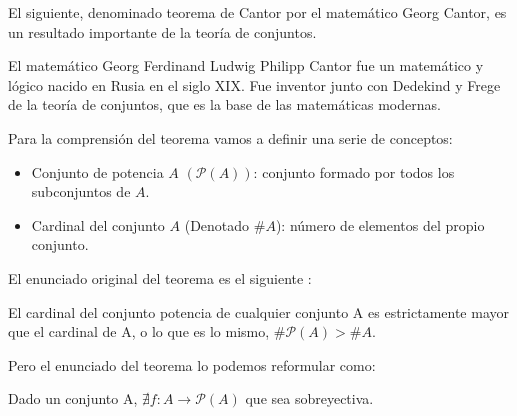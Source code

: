 %
\begin{isabellebody}%
%
%
\isadelimtheory
\isanewline
%
\endisadelimtheory
%
\isatagtheory
%
\endisatagtheory
{\isafoldtheory}%
%
\isadelimtheory
%
\endisadelimtheory
%
\begin{isamarkuptext}%
%
\end{isamarkuptext}\isamarkuptrue%
%
\begin{isamarkuptext}%
%
\end{isamarkuptext}\isamarkuptrue%
%
\begin{isamarkuptext}%
%
\end{isamarkuptext}\isamarkuptrue%
%
\begin{isamarkuptext}%
El siguiente, denominado  teorema de Cantor por el matemático
 Georg Cantor, es un resultado importante de la teoría
 de conjuntos. 

El matemático Georg Ferdinand Ludwig Philipp Cantor fue un matemático y
lógico nacido en Rusia en el siglo XIX. Fue inventor junto con Dedekind
 y Frege de la teoría de conjuntos, que es la base de las matemáticas
 modernas.



Para la comprensión del teorema vamos a definir una serie de conceptos:

\begin {itemize}

\item Conjunto de potencia $A$  $(\mathcal{P}(A))$: conjunto formado por
todos los subconjuntos de $A$.
\item Cardinal del conjunto $A$ (Denotado $\# A$): número de elementos del propio
 conjunto.

\end {itemize}
El enunciado original del teorema es el siguiente : 


\begin {teorema}
El cardinal del conjunto potencia de cualquier conjunto A es
 estrictamente mayor que el cardinal de A, o lo que es lo mismo,
$\# \mathcal{P}(A) > \# A.$


\end {teorema}
Pero el enunciado del teorema lo podemos reformular como: 
\begin{teorema}
Dado un conjunto A, $\nexists  f : A \longrightarrow \mathcal{P}(A)$ que
sea sobreyectiva.

\end{teorema}


\end{isamarkuptext}
\end{isabellebody}
